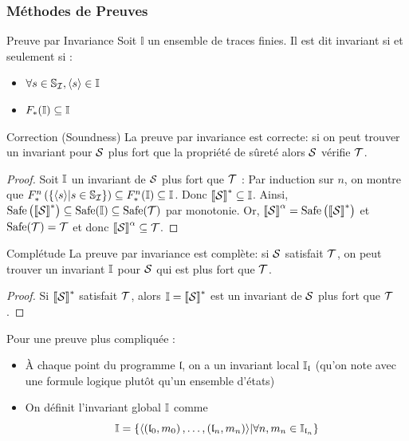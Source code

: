 \documentclass{cours}
\begin{document}
\subsubsection{Méthodes de Preuves}
\begin{définition}{Preuve par Invariance}{}
Soit $\mathbb{I}$ un ensemble de traces finies. Il est dit invariant si et seulement si :
\begin{itemize}
	\item $\forall s \in \mathbb{S}_{\mathcal{I}}, \left\langle s \right\rangle \in \mathbb{I}$
	\item $F_{*}(\mathbb{I}) \subseteq \mathbb{I}$
\end{itemize}
\end{définition}
\begin{théorème}{Correction (Soundness)}{}
La preuve par invariance est correcte: si on peut trouver un invariant pour $\mathcal{S}$ plus fort que la propriété de sûreté alors $\mathcal{S}$ vérifie $\mathcal{T}$.
\end{théorème}
\begin{proof}
	Soit $\mathbb{I}$ un invariant de $\mathcal{S}$ plus fort que $\mathcal{T}$ :
	Par induction sur $n$, on montre que $F_{*}^{n} \left(\left\{\left\langle s \right\rangle \middle| s\in \mathbb{S}_{\mathcal{I}}\right\}\right)\subseteq F_{*}^{n}(\mathbb{I}) \subseteq \mathbb{I}$.
	Donc $\left\llbracket \mathcal{S} \right\rrbracket^{*} \subseteq \mathbb{I}$.
	Ainsi, $\mathrm{Safe}\left(\left\llbracket \mathcal{S} \right\rrbracket^{*}\right) \subseteq \rm Safe(\mathbb{I}) \subseteq Safe(\mathcal{T})$ par monotonie.
	Or, $\left\llbracket \mathcal{S} \right\rrbracket^{\alpha} = {\rm Safe}\left(\left\llbracket \mathcal{S} \right\rrbracket^{*}\right)$ et ${\rm Safe}(\mathcal{T}) = \mathcal{T}$ et donc $\left\llbracket \mathcal{S} \right\rrbracket^{\alpha}\subseteq \mathcal{T}$.
\end{proof}

\begin{théorème}{Complétude}{}
La preuve par invariance est complète: si $\mathcal{S}$ satisfait $\mathcal{T}$, on peut trouver un invariant $\mathbb{I}$ pour $\mathcal{S}$ qui est plus fort que $\mathcal{T}$.
\end{théorème}
\begin{proof}
	Si $\left\llbracket \mathcal{S} \right\rrbracket^{*}$ satisfait $\mathcal{T}$, alors $\mathbb{I} = \left\llbracket \mathcal{S} \right\rrbracket^{*}$ est un invariant de $\mathcal{S}$ plus fort que $\mathcal{T}$.
\end{proof}

Pour une preuve plus compliquée :
\begin{itemize}
	\item À chaque point du programme $\mathfrak{l}$, on a un invariant local $\mathbb{I}_{\mathfrak{l}}$ (qu'on note avec une formule logique plutôt qu'un ensemble d'états)
	\item On définit l'invariant global $\mathbb{I}$ comme
	      \[
		      \mathbb{I} = \left\{\left\langle \left(\mathfrak{l}_{0}, m_{0}\right), \ldots, \left(\mathfrak{l}_{n}, m_{n}\right) \right\rangle\middle| \forall n, m_{n} \in \mathbb{I}_{\mathfrak{l}_{n}}\right\}
	      \]
\end{itemize}
\end{document}
